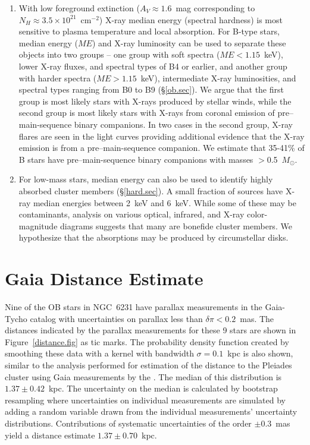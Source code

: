 \documentclass[twocolumn,tighten]{aastex61}
\newcounter{column_number}
\begin{document}
\begin{enumerate}
\item With low foreground extinction ($A_V\approx1.6$~mag corresponding to $N_H\approx3.5\times10^{21}$~cm$^{-2}$) X-ray median energy (spectral hardness) is most sensitive to plasma temperature and local absorption. For B-type stars, median energy ($ME$) and X-ray luminosity can be used to separate these objects into two groups -- one group with soft spectra ($ME<1.15$~keV), lower X-ray fluxes, and spectral types of B4 or earlier, and another group with harder spectra ($ME>1.15$~keV), intermediate X-ray luminosities, and spectral types ranging from B0 to B9 (\S\ref{ob.sec}). We argue that the first group is most likely stars with X-rays produced by stellar winds, while the second group is most likely stars with X-rays from coronal emission of pre--main-sequence binary companions. In two cases in the second group, X-ray flares are seen in the light curves providing additional evidence that the X-ray emission is from a pre--main-sequence companion. We estimate that 35-41\% of B stars have pre--main-sequence binary companions with masses $>$0.5~$M_\odot$. 

\item For low-mass stars, median energy can also be used to identify highly absorbed cluster members (\S\ref{hard.sec}). A small fraction of sources have X-ray median energies between 2~keV and 6~keV. While some of these may be contaminants, analysis on various optical, infrared, and X-ray color-magnitude diagrams suggests that many are bonefide cluster members. We hypothesize that the absorptions may be produced by circumstellar disks.

\end{enumerate}


    
\appendix
\twocolumngrid
\section{Gaia Distance Estimate \label{gaia.sec}}

Nine of the OB stars in NGC~6231 have parallax measurements in the Gaia-Tycho catalog \citep{2016arXiv160904172G} with uncertainties on parallax less than $\delta\pi<0.2$~mas. The distances indicated by the parallax measurements for these 9 stars are shown in Figure~\ref{distance.fig} as tic marks. The probability density function created by smoothing these data with a kernel with bandwidth $\sigma=0.1$~kpc is also shown, similar to the analysis performed for estimation of the distance to the Pleiades cluster using Gaia measurements by the \citet{2016arXiv160904172G}.  The median of this distribution is $1.37\pm0.42$~kpc. The uncertainty on the median is calculated by bootstrap resampling where uncertainties on individual measurements are simulated by adding a random variable drawn from the individual measurements' uncertainty distributions. 
Contributions of systematic uncertainties of the order $\pm0.3$~mas \citep{2016arXiv160904303L} yield a distance estimate $1.37\pm0.70$~kpc.
\end{document}

